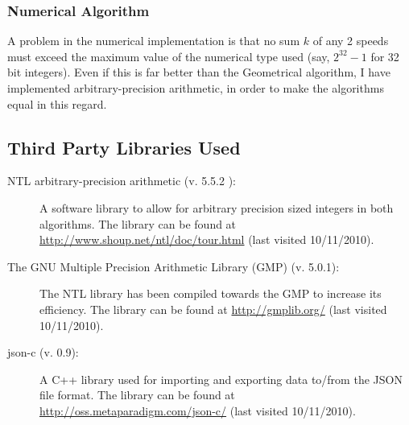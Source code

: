 \subsubsection{Numerical Algorithm}
A problem in the numerical implementation is that no sum $k$ of any 2 speeds must exceed the maximum value of the numerical type used (say, $2^{32} - 1$ for 32 bit integers). Even if this is far better than the Geometrical algorithm, I have implemented arbitrary-precision arithmetic, in order to make the algorithms equal in this regard.



\subsection{Third Party Libraries Used}
\label{third_party}
\begin{description}
\item[NTL arbitrary-precision arithmetic (v. 5.5.2 ):] A software library to allow for arbitrary precision sized integers in both algorithms. The library can be found at \underline{http://www.shoup.net/ntl/doc/tour.html} (last visited 10/11/2010).
\item[The GNU Multiple Precision Arithmetic Library (GMP) (v. 5.0.1):] The NTL library has been compiled towards the GMP to increase its efficiency. The library can be found at \underline{http://gmplib.org/} (last visited 10/11/2010).  
\item[json-c (v. 0.9):] A C++ library used for importing and exporting data to/from the JSON file format. The library can be found at \underline{http://oss.metaparadigm.com/json-c/} (last visited 10/11/2010).
\end{description}
